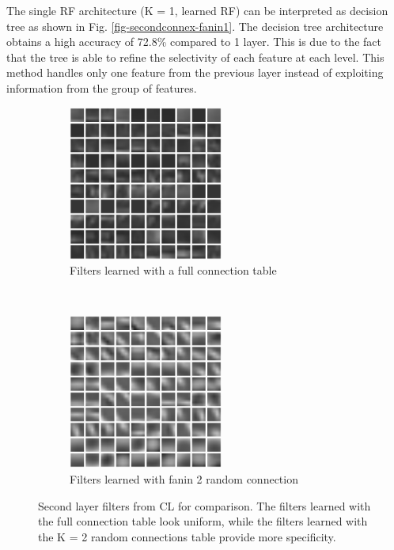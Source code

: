 \documentclass{article} %
\begin{document}
The single RF architecture (K = 1, learned RF) can be interpreted as decision tree as shown in Fig. \ref{fig-secondconnex-fanin1}.
The decision tree architecture obtains a high accuracy of 72.8\% compared to 1 layer. This is due to the fact that the tree is able to refine the selectivity of each feature at each level.
This method handles only one feature from the previous layer instead of exploiting information from the group of features.

\begin{figure}
        \centering
        \label{fig-secondkernels}
        \begin{subfigure}[b]{0.5\textwidth}
                \centering
                \includegraphics[width=2.0in]{fig-kernels2-full.eps}
                \caption{Filters learned with a full connection table}
                \label{fig-secondkernels-full}
        \end{subfigure}%
        ~%
        \begin{subfigure}[b]{0.5\textwidth}
                \centering
                \includegraphics[width=2.0in]{fig-kernels2-random.eps}
                \caption{Filters learned with fanin 2 random connection}
                \label{fig-secondkernels-random}
        \end{subfigure}
        \caption{Second layer filters from CL for comparison.  The filters learned with the full connection table look uniform, while the filters learned with the K = 2 random connections table provide more specificity.}
\end{figure}
\end{document}
